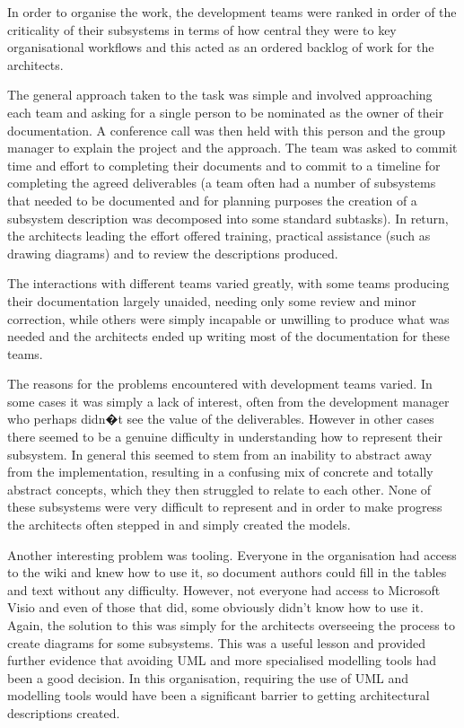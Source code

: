 \begin{itemise}
  In order to organise the work, the development teams were ranked in order of the criticality of their subsystems in terms of how central they were to key organisational workflows and this acted as an ordered backlog of work for the architects.

  The general approach taken to the task was simple and involved approaching each team and asking for a single person to be nominated as the owner of their documentation.  A conference call was then held with this person and the group manager to explain the project and the approach.  The team was asked to commit time and effort to completing their documents and to commit to a timeline for completing the agreed deliverables (a team often had a number of subsystems that needed to be documented and for planning purposes the creation of a subsystem description was decomposed into some standard subtasks).  In return, the architects leading the effort offered training, practical assistance (such as drawing diagrams) and to review the descriptions produced.

  The interactions with different teams varied greatly, with some teams producing their documentation largely unaided, needing only some review and minor correction, while others were simply incapable or unwilling to produce what was needed and the architects ended up writing most of the documentation for these teams. 

  The reasons for the problems encountered with development teams varied.  In some cases it was simply a lack of interest, often from the development manager who perhaps didn�t see the value of the deliverables.  However in other cases there seemed to be a genuine difficulty in understanding how to represent their subsystem.  In general this seemed to stem from an inability to abstract away from the implementation, resulting in a confusing mix of concrete and totally abstract concepts, which they then struggled to relate to each other.  None of these subsystems were very difficult to represent and in order to make progress the architects often stepped in and simply created the models.

  Another interesting problem was tooling.  Everyone in the organisation had access to the wiki and knew how to use it, so document authors could fill in the tables and text without any difficulty.  However, not everyone had access to Microsoft Visio and even of those that did, some obviously didn't know how to use it.  Again, the solution to this was simply for the architects overseeing the process to create diagrams for some subsystems.  This was a useful lesson and provided further evidence that avoiding UML and more specialised modelling tools had been a good decision.  In this organisation, requiring the use of UML and modelling tools would have been a significant barrier to getting architectural descriptions created.


\end{itemise}
